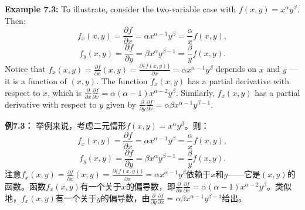 \begin{original}
\textbf{Example 7.3:} To illustrate, consider the two-variable case with $f(x, y) = x^\alpha y^\beta$. Then:
\[
f_x(x, y) = \frac{\partial f}{\partial x} = \alpha x^{\alpha-1} y^\beta = \frac{\alpha}{x} f(x, y),
\]
\[
f_y(x, y) = \frac{\partial f}{\partial y} = \beta x^\alpha y^{\beta-1} = \frac{\beta}{y} f(x, y).
\]
Notice that $f_x(x, y) = \frac{\partial f}{\partial x}(x, y) = \frac{\partial \{f(x, y)\}}{\partial x} = \alpha x^{\alpha-1} y^\beta$ depends on $x$ and $y$ --- it is a function of $(x, y)$. The function $f_x(x, y)$ has a partial derivative with respect to $x$, which is $\frac{\partial}{\partial x}\frac{\partial f}{\partial x} = \alpha(\alpha-1)x^{\alpha-2} y^\beta$. Similarly, $f_x(x, y)$ has a partial derivative with respect to $y$ given by $\frac{\partial}{\partial y}\frac{\partial f}{\partial x} = \alpha\beta x^{\alpha-1} y^{\beta-1}$.
\end{original}
\begin{translation}
\textbf{例7.3：} 举例来说，考虑二元情形$f(x, y) = x^\alpha y^\beta$。则：
\[
f_x(x, y) = \frac{\partial f}{\partial x} = \alpha x^{\alpha-1} y^\beta = \frac{\alpha}{x} f(x, y),
\]
\[
f_y(x, y) = \frac{\partial f}{\partial y} = \beta x^\alpha y^{\beta-1} = \frac{\beta}{y} f(x, y).
\]
注意$f_x(x, y) = \frac{\partial f}{\partial x}(x, y) = \frac{\partial \{f(x, y)\}}{\partial x} = \alpha x^{\alpha-1} y^\beta$依赖于$x$和$y$——它是$(x, y)$的函数。函数$f_x(x, y)$有一个关于$x$的偏导数，即$\frac{\partial}{\partial x}\frac{\partial f}{\partial x} = \alpha(\alpha-1)x^{\alpha-2} y^\beta$。类似地，$f_x(x, y)$有一个关于$y$的偏导数，由$\frac{\partial}{\partial y}\frac{\partial f}{\partial x} = \alpha\beta x^{\alpha-1} y^{\beta-1}$给出。
\end{translation}

